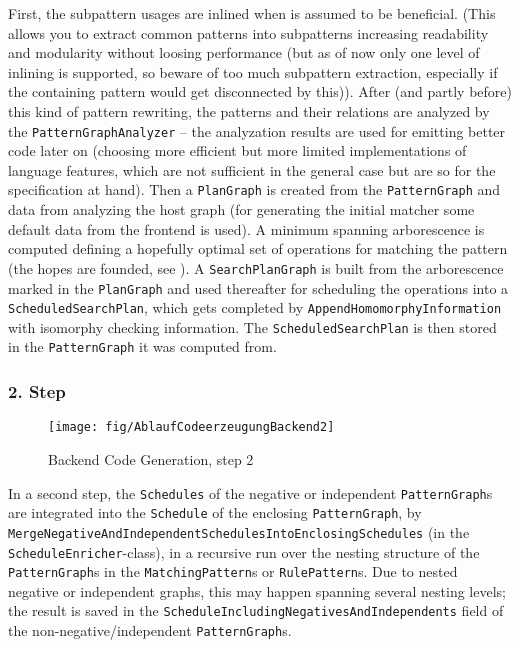 First, the subpattern usages are inlined when  is assumed to be beneficial.
(This allows you to extract common patterns into subpatterns increasing readability and modularity without loosing performance (but as of now only one level of inlining is supported, so beware of too much subpattern extraction, especially if the containing pattern would get disconnected by this)). 
After (and partly before) this kind of pattern rewriting, the patterns and their relations are analyzed by the \texttt{PatternGraphAnalyzer} -- the analyzation results are used for emitting better code later on (choosing more efficient but more limited implementations of language features, which are not sufficient in the general case but are so for the specification at hand).
Then a \texttt{PlanGraph} is created from the \texttt{PatternGraph} and data from analyzing the host graph (for generating the initial matcher some default data from the frontend is used).
A minimum spanning arborescence is computed defining a hopefully optimal set of operations for matching the pattern (the hopes are founded, see \cite{BKG:07}).
A \texttt{SearchPlanGraph} is built from the arborescence marked in the \texttt{PlanGraph} and used thereafter for scheduling the operations into a \texttt{ScheduledSearchPlan}, which gets completed by \texttt{Append\-Homomorphy\-Information} with isomorphy checking information.
The \texttt{ScheduledSearchPlan} is then stored in the \texttt{PatternGraph} it was computed from.


\subsubsection*{2. Step}

\begin{figure}[htbp]
  \centering
  \texttt{[image: fig/AblaufCodeerzeugungBackend2]}
  \caption{Backend Code Generation, step 2}
  \label{figbackendcodegen2}
\end{figure}

In a second step, the \texttt{Schedules} of the negative or independent \texttt{Pattern\-Graph}s are integrated into the \texttt{Schedule} of the enclosing \texttt{Pattern\-Graph}, by \texttt{Merge\-Negative\-And\-Independent\-Schedules\-Into\-Enclosing\-Schedules} (in the \texttt{Schedule\-Enricher}-class), in a recursive run over the nesting structure of the \texttt{Pattern\-Graph}s in the \texttt{Matching\-Pattern}s or \texttt{Rule\-Pattern}s.
Due to nested negative or independent graphs, this may happen spanning several nesting levels;
the result is saved in the \texttt{Schedule\-Including\-Negatives\-And\-Independents} field of the non-negative/independent \texttt{Pattern\-Graph}s.



